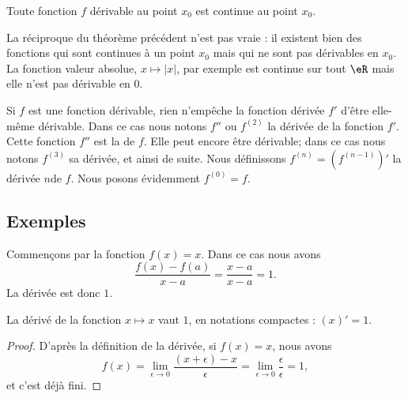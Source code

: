 \begin{theorem} \label{THOooFFOZooCYGets}
  Toute fonction $f$ dérivable au point $x_0$ est continue au point $x_0$.
\end{theorem}

\begin{remark}
     La réciproque du théorème précédent n'est pas vraie : il existent bien des fonctions qui sont continues à un point $x_0$ mais qui ne sont pas dérivables en $x_0$. La fonction valeur absolue, $x\mapsto |x|$, par exemple est continue sur tout $\eR$ mais elle n'est pas dérivable en $0$.
\end{remark}

Si \( f\) est une fonction dérivable, rien n'empêche la fonction dérivée \( f'\) d'être elle-même dérivable. Dans ce cas nous notons \( f''\) ou \( f^{(2)}\) la dérivée de la fonction \( f'\). Cette fonction $f''$ est la  de \( f\). Elle peut encore être dérivable; dans ce cas nous notons \( f^{(3)}\) sa dérivée, et ainsi de suite. Nous définissons \( f^{(n)}=(f^{(n-1)})'\) la dérivée \( n\)\ieme de \( f\). Nous posons évidemment $f^{(0)}=f$.

\subsection{Exemples}

\begin{example}
    Commençons par la fonction $f(x)=x$. Dans ce cas nous avons
    \begin{equation}
        \frac{ f(x)-f(a) }{ x-a }=\frac{ x-a }{ x-a }=1.
    \end{equation}
    La dérivée est donc $1$.
\end{example}

\begin{proposition}
    La dérivé de la fonction $x\mapsto x$ vaut $1$, en notations compactes : $(x)'=1$.
\end{proposition}

\begin{proof}
    D'après la définition de la dérivée, si $f(x)=x$, nous avons
    \begin{equation}
        f(x)=\lim_{\epsilon\to 0}\frac{ (x+\epsilon) -x }{\epsilon} =\lim_{\epsilon\to 0}\frac{ \epsilon }{\epsilon} =1,
    \end{equation}
    et c'est déjà fini.
\end{proof}

